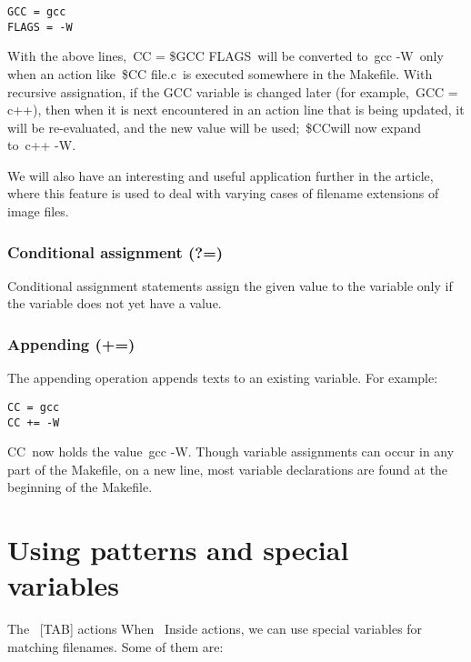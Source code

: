 \documentclass[12pt]{article}
\begin{document}
\begin{verbatim}
GCC = gcc
FLAGS = -W
\end{verbatim}

With the above lines, CC = \${GCC} {FLAGS} will be converted to gcc -W only when an action like \${CC} file.c is executed somewhere in the Makefile. With recursive assignation, if the GCC variable is changed later (for example, GCC = c++), then when it is next encountered in an action line that is being updated, it will be re-evaluated, and the new value will be used; \${CC}will now expand to c++ -W.

We will also have an interesting and useful application further in the article, where this feature is used to deal with varying cases of filename extensions of image files.

\subsubsection *{Conditional assignment (?=)}

Conditional assignment statements assign the given value to the variable only if the variable does not yet have a value.

\subsubsection *{Appending (+=)}

The appending operation appends texts to an existing variable. For example:

\begin{verbatim}
CC = gcc
CC += -W
\end{verbatim}

CC now holds the value gcc -W.
Though variable assignments can occur in any part of the Makefile, on a new line, most variable declarations are found at the beginning of the Makefile.

\section *{Using patterns and special variables}

The %
[TAB] actions
When %
Inside actions, we can use special variables for matching filenames. Some of them are:
\end{document}
